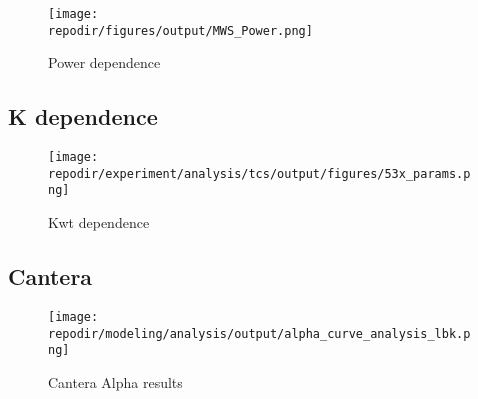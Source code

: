\begin{figure}[h]
    \texttt{[image: \\repodir/figures/output/MWS\_Power.png]} 
    \caption{Power dependence}
    \label{fig:power_dependence}
\end{figure}


\subsection{K dependence}

\begin{figure}[h]
    \texttt{[image: \\repodir/experiment/analysis/tcs/output/figures/53x\_params.png]} 
    \caption{Kwt dependence}
    \label{fig:kwt_dependence}
\end{figure}


\subsection{Cantera}

\begin{figure}[h]
    \texttt{[image: \\repodir/modeling/analysis/output/alpha\_curve\_analysis\_lbk.png]}
    \caption{Cantera Alpha results}
\end{figure}
